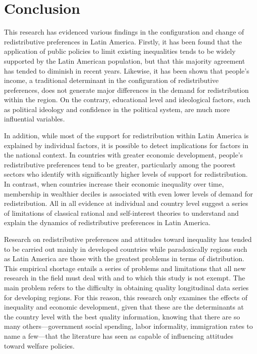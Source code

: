 \documentclass[utf8]{frontiersSCNS} %
\begin{document}
\section{Conclusion}

This research has evidenced various findings in the configuration and change of redistributive preferences in Latin America. Firstly, it has been found that the application of public policies to limit existing inequalities tends to be widely supported by the Latin American population, but that this majority agreement has tended to diminish in recent years. Likewise, it has been shown that people’s income, a traditional determinant in the configuration of redistributive preferences, does not generate major differences in the demand for redistribution within the region. On the contrary, educational level and ideological factors, such as political ideology and confidence in the political system, are much more influential variables.

In addition, while most of the support for redistribution within Latin America is explained by individual factors, it is possible to detect implications for factors in the national context. In countries with greater economic development, people’s redistributive preferences tend to be greater, particularly among the poorest sectors who identify with significantly higher levels of support for redistribution. In contrast, when countries increase their economic inequality over time, membership in wealthier deciles is associated with even lower levels of demand for redistribution. All in all evidence at individual and country level suggest a series of limitations of classical rational and self-interest theories to understand and explain the dynamics of redistributive preferences in Latin America.

Research on redistributive preferences and attitudes toward inequality has tended to be carried out mainly in developed countries while paradoxically regions such as Latin America are those with the greatest problems in terms of distribution. This empirical shortage entails a series of problems and limitations that all new research in the field must deal with and to which this study is not exempt. The main problem refers to the difficulty in obtaining quality longitudinal data series for developing regions. For this reason, this research only examines the effects of inequality and economic development, given that these are the determinants at the country level with the best quality information, knowing that there are so many others—government social spending, labor informality, immigration rates to name a few—that the literature has seen as capable of influencing attitudes toward welfare policies.
\end{document}
